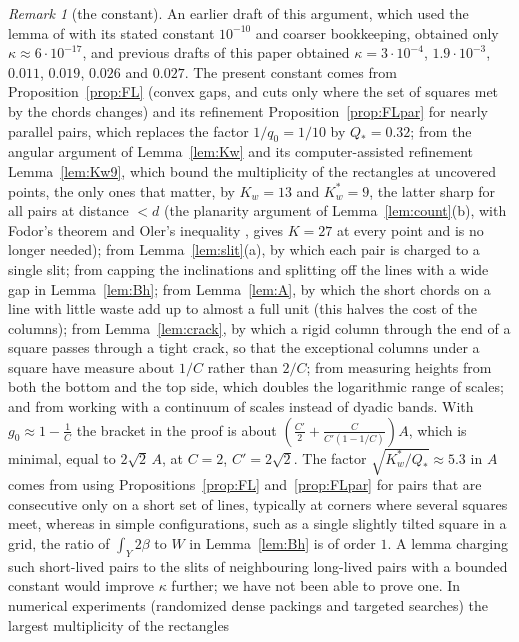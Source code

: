 \documentclass[11pt]{amsart}
\theoremstyle{definition}
\theoremstyle{remark}
\newtheorem{remark}[theorem]{Remark}
\begin{document}
\begin{remark}[the constant]\label{rem:const}
An earlier draft of this argument, which used the lemma of \cite{RV} with its stated constant
$10^{-10}$ and coarser bookkeeping, obtained only $\kappa\approx6\cdot10^{-17}$, and previous drafts of this paper
obtained $\kappa=3\cdot10^{-4}$, $1.9\cdot10^{-3}$, $0.011$, $0.019$, $0.026$ and $0.027$. The present constant comes from
Proposition~\ref{prop:FL} (convex gaps, and cuts only where the set of squares met by the chords changes) and its refinement
Proposition~\ref{prop:FLpar} for nearly parallel pairs, which replaces the factor $1/q_0=1/10$ by $Q_*=0.32$; from the angular argument
of Lemma~\ref{lem:Kw} and its computer-assisted refinement Lemma~\ref{lem:Kw9}, which bound the multiplicity of the rectangles at
uncovered points, the only ones that matter, by $K_w=13$ and $K_w^*=9$, the latter sharp for all pairs at distance $<d$ (the
planarity argument of Lemma~\ref{lem:count}(b), with Fodor's theorem \cite{Fod} and Oler's inequality \cite{Ole,FG}, gives $K=27$ at every
point and is no longer needed); from Lemma~\ref{lem:slit}(a), by which each pair is charged to a single slit;
from capping the inclinations and splitting off the lines with a wide gap in Lemma~\ref{lem:Bh}; from Lemma~\ref{lem:A}, by which the
short chords on a line with little waste add up to almost a full unit (this halves the cost of the columns); from
Lemma~\ref{lem:crack}, by which a rigid column through the end of a square passes through a tight crack, so that the exceptional
columns under a square have measure about $1/C$ rather than $2/C$; from measuring heights from both the bottom and the top side,
which doubles the logarithmic range of scales; and from working with a continuum of scales instead of dyadic bands. With
$g_0\approx1-\frac1C$ the bracket in the proof is about $(\frac{C'}2+\frac C{C'(1-1/C)})A$, which is minimal, equal to $2\sqrt2\,A$, at
$C=2$, $C'=2\sqrt2$. The factor $\sqrt{K_w^*/Q_*}\approx5.3$ in $A$ comes from using Propositions~\ref{prop:FL}
and~\ref{prop:FLpar} for pairs that are consecutive only on a short set of lines, typically at corners where several squares meet,
whereas in simple configurations, such as a single slightly tilted square in a grid, the ratio of $\int_Y2\beta$ to $W$ in
Lemma~\ref{lem:Bh} is of order $1$. A lemma charging such short-lived pairs to the slits of neighbouring long-lived pairs with a
bounded constant would improve $\kappa$ further; we have not been able to prove one. In numerical experiments (randomized dense packings and targeted searches) the largest multiplicity of the rectangles

\end{remark}
\end{document}
